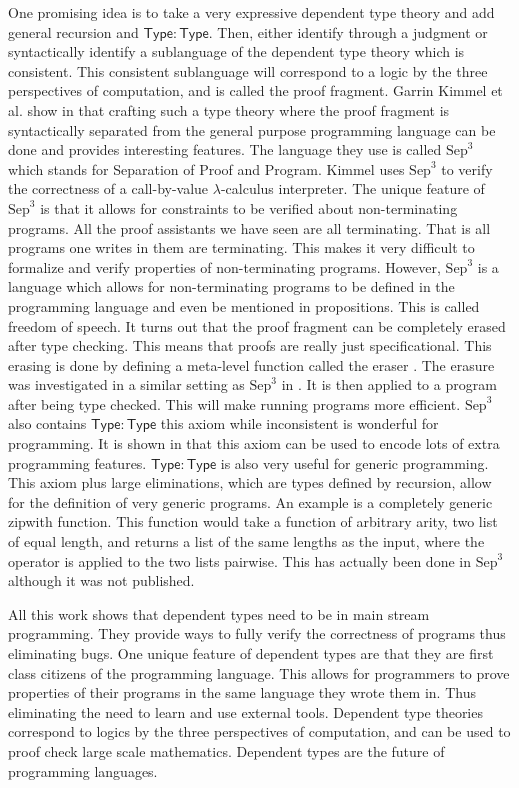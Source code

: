 \documentclass{article}
\begin{document}
One promising idea is to take a very expressive dependent type theory
and add general recursion and $\mathsf{Type:Type}$.  Then, either
identify through a judgment or syntactically identify a sublanguage of
the dependent type theory which is consistent.  This consistent
sublanguage will correspond to a logic by the three perspectives of
computation, and is called the proof fragment.  Garrin Kimmel et
al. show in \cite{Kimmel:2012} that crafting such a type theory where
the proof fragment is syntactically separated from the general purpose
programming language can be done and provides interesting features.
The language they use is called $\text{Sep}^3$ which stands for
Separation of Proof and Program. Kimmel uses $\text{Sep}^3$ to verify
the correctness of a call-by-value $\lambda$-calculus interpreter.
The unique feature of $\text{Sep}^3$ is that it allows for constraints
to be verified about non-terminating programs.  All the proof
assistants we have seen are all terminating.  That is all programs one
writes in them are terminating.  This makes it very difficult to
formalize and verify properties of non-terminating programs.  However,
$\text{Sep}^3$ is a language which allows for non-terminating programs
to be defined in the programming language and even be mentioned in
propositions.  This is called freedom of speech.  It turns out that
the proof fragment can be completely erased after type checking.  This
means that proofs are really just specificational.  This erasing is
done by defining a meta-level function called the eraser
\cite{Mishra-Linger:2008}.  The erasure was investigated in a similar
setting as $\text{Sep}^3$ in \cite{Sjoberg:2012}.  It is then applied
to a program after being type checked.  This will make running
programs more efficient.  $\text{Sep}^3$ also contains
$\mathsf{Type:Type}$ this axiom while inconsistent is wonderful for
programming.  It is shown in \cite{Cardelli-1986} that this axiom can
be used to encode lots of extra programming features.
$\mathsf{Type:Type}$ is also very useful for generic programming.
This axiom plus large eliminations, which are types defined by
recursion, allow for the definition of very generic programs.  An
example is a completely generic zipwith function.  This function would
take a function of arbitrary arity, two list of equal length, and
returns a list of the same lengths as the input, where the operator is
applied to the two lists pairwise.  This has actually been done in
$\text{Sep}^3$ although it was not published.

All this work shows that dependent types need to be in main stream
programming.  They provide ways to fully verify the correctness of
programs thus eliminating bugs.  One unique feature of dependent types
are that they are first class citizens of the programming language.
This allows for programmers to prove properties of their programs in
the same language they wrote them in.  Thus eliminating the need to
learn and use external tools.  Dependent type theories correspond to
logics by the three perspectives of computation, and can be used to
proof check large scale mathematics.  Dependent types are the future
of programming languages.
\end{document}
